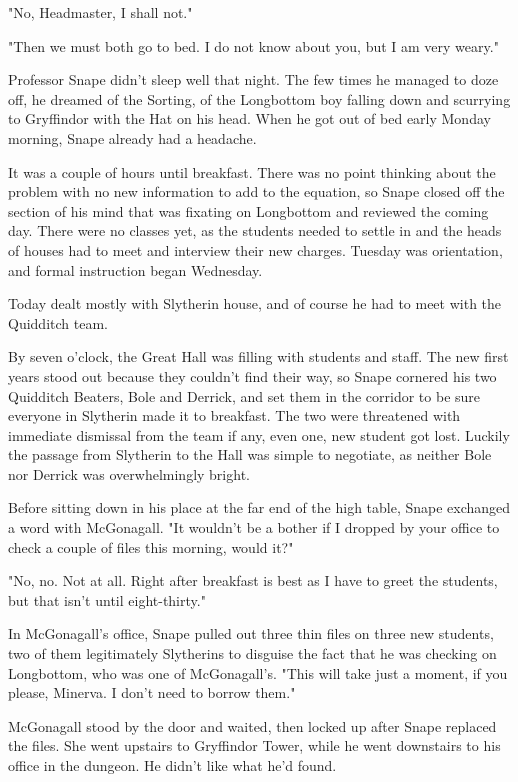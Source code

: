 \documentclass[a4paper,11pt]{article}
\begin{document}
"No, Headmaster, I shall not."

"Then we must both go to bed. I do not know about you, but I am very weary."

Professor Snape didn't sleep well that night. The few times he managed to doze off, he dreamed of the Sorting, of the Longbottom boy falling down and scurrying to Gryffindor with the Hat on his head. When he got out of bed early Monday morning, Snape already had a headache.

It was a couple of hours until breakfast. There was no point thinking about the problem with no new information to add to the equation, so Snape closed off the section of his mind that was fixating on Longbottom and reviewed the coming day. There were no classes yet, as the students needed to settle in and the heads of houses had to meet and interview their new charges. Tuesday was orientation, and formal instruction began Wednesday.

Today dealt mostly with Slytherin house, and of course he had to meet with the Quidditch team.

By seven o'clock, the Great Hall was filling with students and staff. The new first years stood out because they couldn't find their way, so Snape cornered his two Quidditch Beaters, Bole and Derrick, and set them in the corridor to be sure everyone in Slytherin made it to breakfast. The two were threatened with immediate dismissal from the team if any, even one, new student got lost. Luckily the passage from Slytherin to the Hall was simple to negotiate, as neither Bole nor Derrick was overwhelmingly bright.

Before sitting down in his place at the far end of the high table, Snape exchanged a word with McGonagall. "It wouldn't be a bother if I dropped by your office to check a couple of files this morning, would it?"

"No, no. Not at all. Right after breakfast is best as I have to greet the students, but that isn't until eight-thirty."

In McGonagall's office, Snape pulled out three thin files on three new students, two of them legitimately Slytherins to disguise the fact that he was checking on Longbottom, who was one of McGonagall's. "This will take just a moment, if you please, Minerva. I don't need to borrow them."

McGonagall stood by the door and waited, then locked up after Snape replaced the files. She went upstairs to Gryffindor Tower, while he went downstairs to his office in the dungeon. He didn't like what he'd found.
\end{document}
